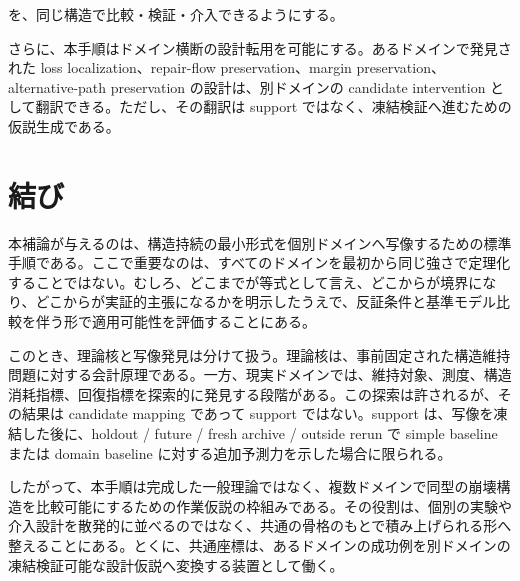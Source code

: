 \documentclass[12pt,a4paper]{article}
\begin{document}
を、同じ構造で比較・検証・介入できるようにする。

さらに、本手順はドメイン横断の設計転用を可能にする。あるドメインで発見された loss localization、repair-flow preservation、margin preservation、alternative-path preservation の設計は、別ドメインの candidate intervention として翻訳できる。ただし、その翻訳は support ではなく、凍結検証へ進むための仮説生成である。

\section{結び}\label{ux7d50ux3073}

本補論が与えるのは、構造持続の最小形式を個別ドメインへ写像するための標準手順である。ここで重要なのは、すべてのドメインを最初から同じ強さで定理化することではない。むしろ、どこまでが等式として言え、どこからが境界になり、どこからが実証的主張になるかを明示したうえで、反証条件と基準モデル比較を伴う形で適用可能性を評価することにある。

このとき、理論核と写像発見は分けて扱う。理論核は、事前固定された構造維持問題に対する会計原理である。一方、現実ドメインでは、維持対象、測度、構造消耗指標、回復指標を探索的に発見する段階がある。この探索は許されるが、その結果は candidate mapping であって support ではない。support は、写像を凍結した後に、holdout / future / fresh archive / outside rerun で simple baseline または domain baseline に対する追加予測力を示した場合に限られる。

したがって、本手順は完成した一般理論ではなく、複数ドメインで同型の崩壊構造を比較可能にするための作業仮説の枠組みである。その役割は、個別の実験や介入設計を散発的に並べるのではなく、共通の骨格のもとで積み上げられる形へ整えることにある。とくに、共通座標は、あるドメインの成功例を別ドメインの凍結検証可能な設計仮説へ変換する装置として働く。
\end{document}
